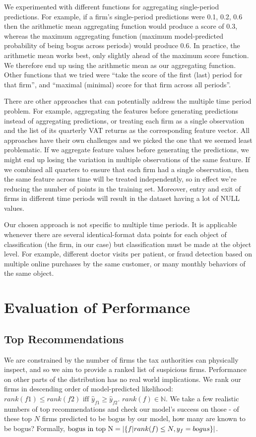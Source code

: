 We experimented with different functions for aggregating single-period predictions. For example, if a firm's single-period predictions were 0.1, 0.2, 0.6 then the arithmetic mean aggregating function would produce a score of $0.3$, whereas the maximum aggregating function  (maximum model-predicted probability of being bogus across periods) would produce $0.6$. In practice, the arithmetic mean works best, only slightly ahead of the maximum score function. We therefore end up using the arithmetic mean as our aggregating function. Other functions that we tried were ``take the score of the first (last) period for that firm'', and ``maximal (minimal) score for that firm across all periods''.  

There are other approaches that can potentially address the multiple time period problem. For example, aggregating the features before generating predictions instead of aggregating predictions, or treating each firm as a single observation and the list of its quarterly VAT returns as the corresponding feature vector. All approaches have their own challenges and we picked the one that we seemed least problematic. If we aggregate feature values before generating the predictions, we might end up losing the variation in  multiple observations of the same feature. If we combined all quarters to ensure that each firm had a single observation, then the same feature across time will be treated independently, so in effect we’re reducing the number of points in the training set. Moreover, entry and exit of firms in different time periods will result in the dataset having a lot of NULL values.

Our chosen approach is not specific to multiple time periods. It is applicable whenever there are several identical-format data points for each object of classification (the firm, in our case) but classification must be made at the object level. For example, different doctor visits per patient,  or fraud detection based on multiple online purchases by the same customer, or many monthly behaviors of the same object.

\section{Evaluation of Performance}
\label{sec:evaluation}
\subsection{Top Recommendations}
\label{subsec:top-recommendations}
We are constrained by the number of firms the tax authorities can physically inspect, and so we aim to provide a ranked list of suspicious firms. Performance on other parts of the distribution has no real world implications. We rank our firms in descending order of model-predicted likelihood: $rank(f1) \leq rank(f2) \text{ iff } \hat{y}_{f1}\geq \hat{y}_{f2}\text{.  } rank(f) \in \mathbb{N}$. We take a few realistic numbers of top recommendations and check our model's success on those - of these top $N$ firms predicted to be bogus by our model, how many are known to be bogus? Formally, $\text{bogus in top N}=|\{f\space|\space rank(f)\le N,y_f=bogus\}|$. 

